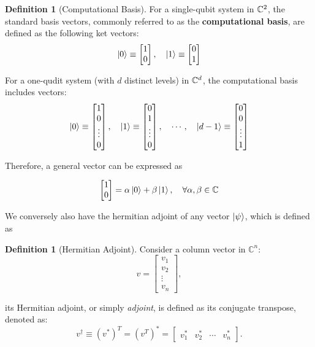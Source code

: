 \documentclass[12pt]{article}
\theoremstyle{definition}
\newtheorem{definition}[theorem]{Definition}
\begin{document}
\begin{definition}[Computational Basis]
For a single-qubit system in $\mathbb{C}^2$, the standard basis vectors, commonly referred to as the \textbf{computational basis}, are defined as the following ket vectors:
\[
\ket{0} \equiv \begin{bmatrix} 1 \\ 0 \end{bmatrix}, \quad \ket{1} \equiv \begin{bmatrix} 0 \\ 1 \end{bmatrix}
\]

For a one-qudit system (with $d$ distinct levels) in $\mathbb{C}^d$, the computational basis includes vectors:
\[
\ket{0} \equiv \begin{bmatrix} 1 \\ 0 \\ \vdots \\ 0 \end{bmatrix}, \quad \ket{1} \equiv \begin{bmatrix} 0 \\ 1 \\ \vdots \\ 0 \end{bmatrix}, \quad \cdots, \quad \ket{d-1} \equiv \begin{bmatrix} 0 \\ 0 \\ \vdots \\ 1 \end{bmatrix}
\]
\end{definition}

Therefore, a general vector can be expressed as 

$$
\begin{bmatrix}
    1 \\ 0
\end{bmatrix}
= 
\alpha \ket{0}
+
 \beta \ket{1}, \quad \forall \alpha, \beta \in \mathbb{C}
$$

We conversely also have the hermitian adjoint of any vector $\ket{\psi}$, which is defined as 

\begin{definition}[Hermitian Adjoint]
    Consider a column vector in $\mathbb{C}^n$:
    \[
    v = \begin{bmatrix}
    v_1 \\
    v_2 \\
    \vdots \\
    v_n
    \end{bmatrix},
    \]

    its Hermitian adjoint, or simply \textit{adjoint}, is defined as its conjugate transpose, denoted as:
    \[
    v^\dagger \equiv (v^*)^T = (v^T)^* = \begin{bmatrix} v_1^* & v_2^* & \cdots & v_n^* \end{bmatrix}.
    \]
\end{definition}
\end{document}
